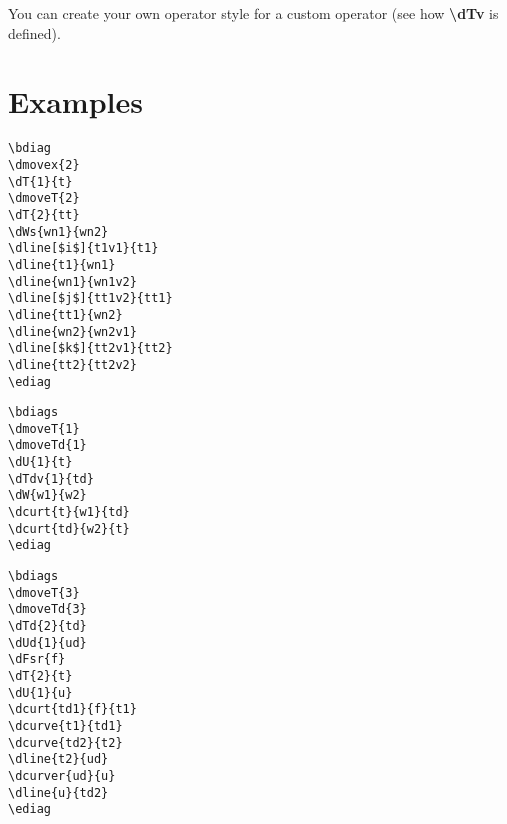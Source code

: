 \documentclass[a4paper]{article}
\begin{document}
You can create your own operator style for a custom operator (see how {\bf \textbackslash dTv} is
defined).

\section{Examples}

\begin{table}[ht]
 \begin{minipage}[b]{0.5\linewidth}\centering
  \begin{lstlisting}
\bdiag
\dmovex{2}
\dT{1}{t}
\dmoveT{2}
\dT{2}{tt}
\dWs{wn1}{wn2}
\dline[$i$]{t1v1}{t1}
\dline{t1}{wn1}
\dline{wn1}{wn1v2}
\dline[$j$]{tt1v2}{tt1}
\dline{tt1}{wn2}
\dline{wn2}{wn2v1}
\dline[$k$]{tt2v1}{tt2}
\dline{tt2}{tt2v2}
\ediag
  \end{lstlisting}
 \end{minipage}
 \begin{minipage}[b]{0.5\linewidth}\centering
\bdiag
{}
\ediag
 \end{minipage}
\end{table}

\begin{table}[ht]
 \begin{minipage}[b]{0.5\linewidth}\centering
  \begin{lstlisting}
\bdiags
\dmoveT{1}
\dmoveTd{1}
\dU{1}{t}
\dTdv{1}{td}
\dW{w1}{w2}
\dcurt{t}{w1}{td}
\dcurt{td}{w2}{t}
\ediag
  \end{lstlisting}
 \end{minipage}
 \begin{minipage}[b]{0.5\linewidth}\centering
\bdiags
{}
\ediag
 \end{minipage}
\end{table}

\begin{table}[ht]
 \begin{minipage}[b]{0.5\linewidth}\centering
  \begin{lstlisting}
\bdiags
\dmoveT{3}
\dmoveTd{3}
\dTd{2}{td}
\dUd{1}{ud}
\dFsr{f}
\dT{2}{t}
\dU{1}{u}
\dcurt{td1}{f}{t1}
\dcurve{t1}{td1}
\dcurve{td2}{t2}
\dline{t2}{ud}
\dcurver{ud}{u}
\dline{u}{td2}
\ediag
  \end{lstlisting}
 \end{minipage}
 \begin{minipage}[b]{0.5\linewidth}\centering
\bdiags
{}
\ediag
 \end{minipage}
\end{table}
\end{document}
